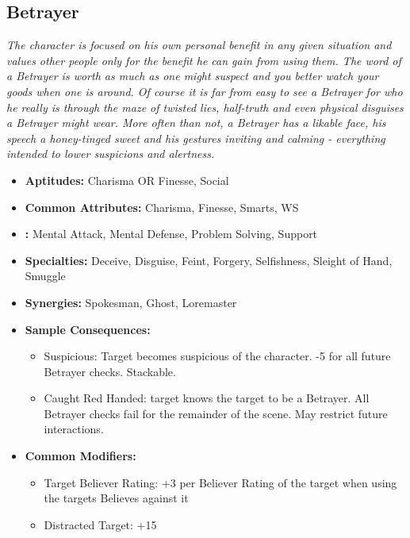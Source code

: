 \subsection{Betrayer}\label{Betrayer}
\textit{The character is focused on his own personal benefit in any given situation and values other people only for the benefit he can gain from using them.
The word of a Betrayer is worth as much as one might suspect and you better watch your goods when one is around.
Of course it is far from easy to see a Betrayer for who he really is through the maze of twisted lies, half-truth and even physical disguises a Betrayer might wear.
More often than not, a Betrayer has a likable face, his speech a honey-tinged sweet and his gestures inviting and calming - everything intended to lower suspicions and alertness.}
\begin{itemize}
	\item \textbf{Aptitudes:} Charisma OR Finesse, Social
	\item \textbf{Common Attributes:}  Charisma, Finesse, Smarts, WS
	\item \textbf{:} Mental Attack, Mental Defense, Problem Solving, Support
	\item \textbf{Specialties:} Deceive, Disguise, Feint, Forgery, Selfishness, Sleight of Hand, Smuggle
	\item \textbf{Synergies:} Spokesman, Ghost, Loremaster
	\item \textbf{Sample Consequences:} 
	\begin{itemize}
		\item Suspicious: Target becomes suspicious of the character. -5 for all future Betrayer checks. Stackable.
		\item Caught Red Handed: target knows the target to be a Betrayer. All Betrayer checks fail for the remainder of the scene. May restrict future interactions.
	\end{itemize}
	\item \textbf{Common Modifiers:}
	\begin{itemize}
		\item Target Believer Rating: +3 per Believer Rating of the target when using the targets Believes against it
		\item Distracted Target: +15
	\end{itemize}
\end{itemize}

